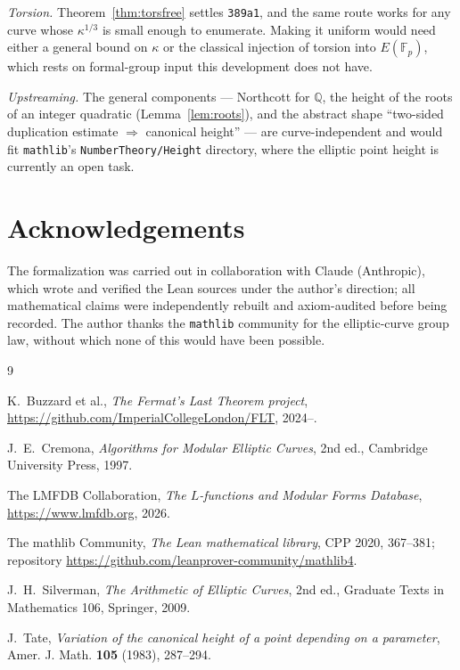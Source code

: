 \documentclass[11pt,reqno]{amsart}
\theoremstyle{plain}
\theoremstyle{definition}
\theoremstyle{remark}
\begin{document}
\emph{Torsion.} Theorem~\ref{thm:torsfree} settles \texttt{389a1}, and the
same route works for any curve whose $\kappa^{1/3}$ is small enough to
enumerate. Making it uniform would need either a general bound on $\kappa$
or the classical injection of torsion into $E(\mathbb{F}_p)$, which rests on
formal-group input this development does not have.

\emph{Upstreaming.} The general components --- Northcott for $\mathbb{Q}$,
the height of the roots of an integer quadratic (Lemma~\ref{lem:roots}), and
the abstract shape ``two-sided duplication estimate $\Rightarrow$ canonical
height'' --- are curve-independent and would fit \texttt{mathlib}'s
\texttt{NumberTheory/Height} directory, where the elliptic point height is
currently an open task.

\section*{Acknowledgements}

The formalization was carried out in collaboration with Claude (Anthropic),
which wrote and verified the Lean sources under the author's direction; all
mathematical claims were independently rebuilt and axiom-audited before being
recorded. The author thanks the \texttt{mathlib} community for the
elliptic-curve group law, without which none of this would have been
possible.

\begin{thebibliography}{9}

K.~Buzzard et al.,
\emph{The Fermat's Last Theorem project},
\url{https://github.com/ImperialCollegeLondon/FLT}, 2024--.

J.~E.~Cremona,
\emph{Algorithms for Modular Elliptic Curves},
2nd ed., Cambridge University Press, 1997.

The LMFDB Collaboration,
\emph{The $L$-functions and Modular Forms Database},
\url{https://www.lmfdb.org}, 2026.

The mathlib Community,
\emph{The Lean mathematical library},
CPP 2020, 367--381; repository \url{https://github.com/leanprover-community/mathlib4}.

J.~H.~Silverman,
\emph{The Arithmetic of Elliptic Curves},
2nd ed., Graduate Texts in Mathematics 106, Springer, 2009.

J.~Tate,
\emph{Variation of the canonical height of a point depending on a parameter},
Amer. J. Math. \textbf{105} (1983), 287--294.

\end{thebibliography}
\end{document}

